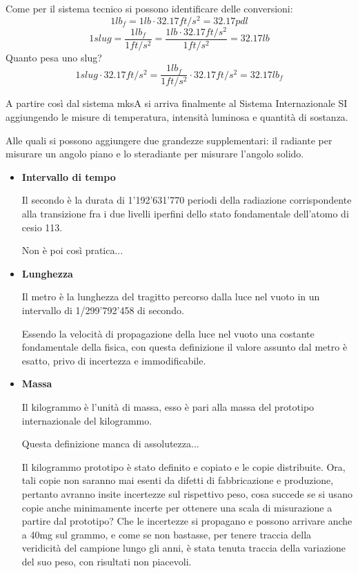\documentclass[a4paper, 15pt]{article}
\begin{document}
\begin{adjustwidth}{2in}{}
\begin{itemize}
		Come per il sistema tecnico si possono identificare delle conversioni:
		\[ 1lb_f = 1lb \cdot 32.17 ft/s^2 = 32.17 pdl \]
		\[ 1slug = \dfrac{1lb_f}{1ft/s^2} = \dfrac{1lb \cdot 32.17 ft/s^2}{1ft/s^2} = 32.17 lb \]
		Quanto pesa uno slug?
		\[ 1slug \cdot 32.17 ft/s^2 = \dfrac{1lb_f}{1ft/s^2} \cdot 32.17 ft/s^2 = 32.17 lb_f  \]
	\end{itemize}

	A partire così dal sistema mksA si arriva finalmente al Sistema Internazionale SI aggiungendo le misure di temperatura, intensità luminosa e quantità di sostanza.

	Alle quali si possono aggiungere due grandezze supplementari: il radiante per misurare un angolo piano e lo steradiante per misurare l'angolo solido. 
	
	\begin{itemize}
		\item \textbf{Intervallo di tempo} 
		 
		Il secondo è la durata di 1'192'631'770 periodi della radiazione corrispondente alla transizione fra i due livelli iperfini dello stato fondamentale dell'atomo di cesio 113. 
		
		Non è poi così pratica...
		
		\item \textbf{Lunghezza} 
		
		Il metro è la lunghezza del tragitto percorso dalla luce nel vuoto in un intervallo di 1/299'792'458 di secondo.
		
		Essendo la velocità di propagazione della luce nel vuoto una costante fondamentale della fisica, con questa definizione il valore assunto dal metro è esatto, privo di incertezza e immodificabile. 
		
		\item \textbf{Massa} 
		
		Il kilogrammo è l'unità di massa, esso è pari alla massa del prototipo internazionale del kilogrammo. 
		
		Questa definizione manca di assolutezza...  
		
		Il kilogrammo prototipo è stato definito e copiato e le copie distribuite. Ora, tali copie non saranno mai esenti da difetti di fabbricazione e produzione, pertanto avranno insite incertezze sul rispettivo peso, cosa succede se si usano copie anche minimamente incerte per ottenere una scala di misurazione a partire dal prototipo? Che le incertezze si propagano e possono arrivare anche a 40mg sul grammo, e come se non bastasse, per tenere traccia della veridicità del campione lungo gli anni, è stata tenuta traccia della variazione del suo peso, con risultati non piacevoli.


\end{itemize}
\end{adjustwidth}
\end{document}
